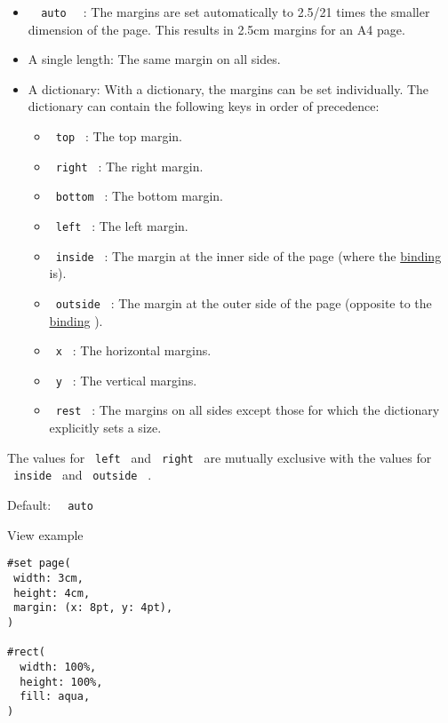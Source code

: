 \begin{itemize}
\tightlist
\item
  \texttt{\ }{\texttt{\ auto\ }}\texttt{\ } : The margins are set
  automatically to 2.5/21 times the smaller dimension of the page. This
  results in 2.5cm margins for an A4 page.
\item
  A single length: The same margin on all sides.
\item
  A dictionary: With a dictionary, the margins can be set individually.
  The dictionary can contain the following keys in order of precedence:

  \begin{itemize}
  \tightlist
  \item
    \texttt{\ top\ } : The top margin.
  \item
    \texttt{\ right\ } : The right margin.
  \item
    \texttt{\ bottom\ } : The bottom margin.
  \item
    \texttt{\ left\ } : The left margin.
  \item
    \texttt{\ inside\ } : The margin at the inner side of the page
    (where the
    \href{/docs/reference/layout/page/\#parameters-binding}{binding}
    is).
  \item
    \texttt{\ outside\ } : The margin at the outer side of the page
    (opposite to the
    \href{/docs/reference/layout/page/\#parameters-binding}{binding} ).
  \item
    \texttt{\ x\ } : The horizontal margins.
  \item
    \texttt{\ y\ } : The vertical margins.
  \item
    \texttt{\ rest\ } : The margins on all sides except those for which
    the dictionary explicitly sets a size.
  \end{itemize}
\end{itemize}

The values for \texttt{\ left\ } and \texttt{\ right\ } are mutually
exclusive with the values for \texttt{\ inside\ } and
\texttt{\ outside\ } .

Default: \texttt{\ }{\texttt{\ auto\ }}\texttt{\ }


View example

\begin{verbatim}
#set page(
 width: 3cm,
 height: 4cm,
 margin: (x: 8pt, y: 4pt),
)

#rect(
  width: 100%,
  height: 100%,
  fill: aqua,
)
\end{verbatim}

